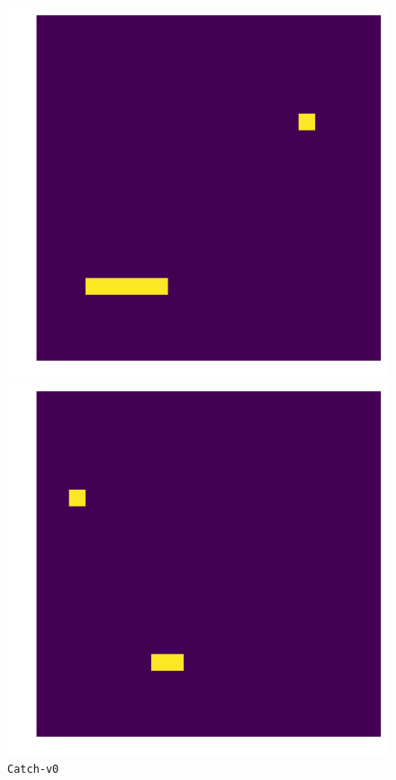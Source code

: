 \begin{figure}[ht]
\centering
\begin{minipage}[b]{0.35\linewidth}
\centering
\includegraphics[width=\textwidth]{./Images/Chapter08/catch_v0}
\caption{\texttt{Catch-v0}}
\label{fig:fig1}
\end{minipage}
\hspace{0.5cm}
\begin{minipage}[b]{0.35\linewidth}
\centering
\includegraphics[width=\textwidth]{./Images/Chapter08/catch_v2}

\end{minipage}
\end{figure}
